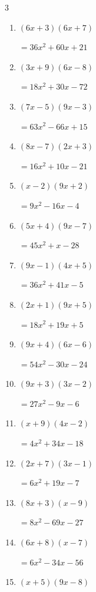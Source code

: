 \begin{multicols}{3}
\begin{enumerate}
        $=24x^{2}-79x+40$

\columnbreak %

\resetques

  \item $(6x+3)(6x+7)$

        $=36x^{2}+60x+21$

  \item $(3x+9)(6x-8)$

        $=18x^{2}+30x-72$

  \item $(7x-5)(9x-3)$

        $=63x^{2}-66x+15$

  \item $(8x-7)(2x+3)$

        $=16x^{2}+10x-21$

  \item $(x-2)(9x+2)$

        $=9x^{2}-16x-4$

  \item $(5x+4)(9x-7)$

        $=45x^{2}+x-28$

  \item $(9x-1)(4x+5)$

        $=36x^{2}+41x-5$

  \item $(2x+1)(9x+5)$

        $=18x^{2}+19x+5$

  \item $(9x+4)(6x-6)$

        $=54x^{2}-30x-24$

  \item $(9x+3)(3x-2)$

        $=27x^{2}-9x-6$

  \item $(x+9)(4x-2)$

        $=4x^{2}+34x-18$

  \item $(2x+7)(3x-1)$

        $=6x^{2}+19x-7$

  \item $(8x+3)(x-9)$

        $=8x^{2}-69x-27$

  \item $(6x+8)(x-7)$

        $=6x^{2}-34x-56$

  \item $(x+5)(9x-8)$


\end{enumerate}
\end{multicols}
